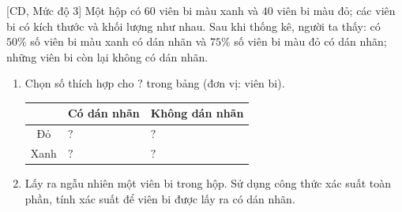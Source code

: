 \begin{bt}%
[CD, Mức độ 3]%
	Một hộp có $60$ viên bi màu xanh và $40$ viên bi màu đỏ; các viên bi có kích thước và khối lượng như nhau. Sau khi thống kê, người ta thấy: có $50\%$ số viên bi màu xanh có dán nhãn và $75\%$ số viên bi màu đỏ có dán nhãn; những viên bi còn lại không có dán nhãn.
	\begin{enumerate}
		\item Chọn số thích hợp cho $\boxed{?}$ trong bảng (đơn vị: viên bi).
		\begin{center}
			\begin{tabular}{|c|C{3cm}|C{3cm}|}
				\hline 
				 & Có dán nhãn & Không dán nhãn \\
				\hline 
				Đỏ & $\boxed{?}$ & $\boxed{?}$ \\
				\hline
				Xanh & $\boxed{?}$ & $\boxed{?}$\\
				\hline
			\end{tabular}
		\end{center}
		\item Lấy ra ngẫu nhiên một viên bi trong hộp. Sử dụng công thức xác suất toàn phần, tính xác suất để viên bi được lấy ra có dán nhãn.
	\end{enumerate}
\end{bt}

